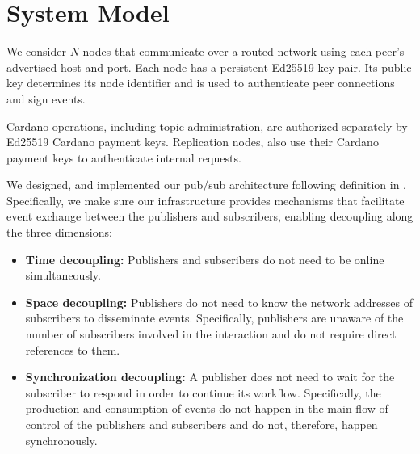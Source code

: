 \section{System Model}
\label{sec:system-model}

We consider $N$ nodes that communicate over a routed network using each peer's advertised host and port.
Each node has a persistent Ed25519 key pair. Its public key determines its node identifier and is used to authenticate peer connections and sign events.

Cardano operations, including topic administration, are authorized separately by Ed25519 Cardano payment keys. 
Replication nodes, also use their Cardano payment keys to authenticate internal requests.

We designed, and implemented our pub/sub architecture following definition in \cite{FacesOfPubSub}. 
Specifically, we make sure our infrastructure provides mechanisms that facilitate event exchange between the 
publishers and subscribers, enabling decoupling along the three dimensions:

\begin{itemize}
    \item \textbf{Time decoupling: }Publishers and subscribers do not need to be online simultaneously.
    \item \textbf{Space decoupling: }Publishers do not need to know the network addresses of subscribers to disseminate 
events. Specifically, publishers are unaware of the number of subscribers involved in the interaction and do 
not require direct references to them.
    \item \textbf{Synchronization decoupling: }A publisher does not need to wait for the subscriber to respond in order to 
continue its workflow. Specifically, the production and consumption of events do not happen in the main flow 
of control of the publishers and subscribers and do not, therefore, happen synchronously.
\end{itemize}

